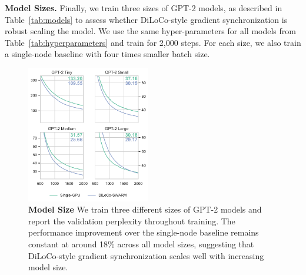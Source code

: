 \documentclass{article}
\begin{document}
\textbf{Model Sizes.} Finally, we train three sizes of GPT-2 models, as 
described in Table~\ref{tab:models} to assess whether DiLoCo-style gradient
synchronization is robust scaling the model. We use the same hyper-parameters
for all models from Table~\ref{tab:hyperparameters} and train for 2,000 steps.
For each size, we also train a single-node baseline with four times smaller
batch size.

\begin{figure}[ht]
  \centering
  \includegraphics[width=0.48\textwidth]{figures/experiment3.pdf}
  \caption{\textbf{Model Size} We train three different sizes of GPT-2 models and report the validation perplexity throughout training. The performance improvement over the single-node baseline remains constant at around 18\% across all model sizes, suggesting that DiLoCo-style gradient synchronization scales well with increasing model size.}
  \label{fig:experiment3}
\end{figure}

\end{document}
